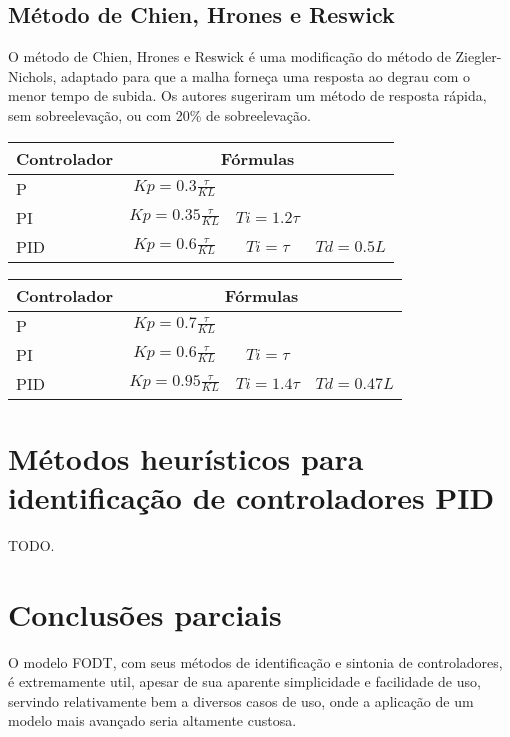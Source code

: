     \subsection{Método de Chien, Hrones e Reswick}
        
        O método de Chien, Hrones e Reswick é uma modificação do método
        de Ziegler-Nichols, adaptado para que a malha forneça uma resposta ao
        degrau com o menor tempo de subida. Os autores sugeriram um método
        de resposta rápida, sem sobreelevação, ou com 20\% de sobreelevação.
        
        \begin{center}
            \begin{tabular}{l*{3}{c}}
Controlador & \multicolumn{3}{c}{Fórmulas} \\
\hline
P   & $Kp = 0.3\frac{\tau}{KL}$     &              & \\
PI  & $Kp = 0.35\frac{\tau}{KL}$ & $Ti = 1.2\tau$ & \\
PID & $Kp = 0.6\frac{\tau}{KL}$ & $Ti = \tau$ & $Td = 0.5L$ \\
            \end{tabular}
        \end{center}

        \newpage

        \begin{center}
            \begin{tabular}{l*{3}{c}}
Controlador & \multicolumn{3}{c}{Fórmulas} \\
\hline
P   & $Kp = 0.7\frac{\tau}{KL}$     &              & \\
PI  & $Kp = 0.6\frac{\tau}{KL}$ & $Ti = \tau$ & \\
PID & $Kp = 0.95\frac{\tau}{KL}$ & $Ti = 1.4\tau$ & $Td = 0.47L$ \\
            \end{tabular}
        \end{center}


\section{Métodos heurísticos para identificação de controladores PID}

    TODO.

\section{Conclusões parciais}

    O modelo \acs{FODT}, com seus métodos de identificação e sintonia de
    controladores, é extremamente util, apesar de sua aparente simplicidade e
    facilidade de uso, servindo relativamente bem a diversos casos de uso, onde
    a aplicação de um modelo mais avançado seria altamente custosa.
